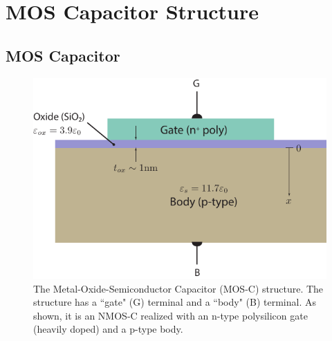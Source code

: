 \section{MOS Capacitor Structure}
\subsection{MOS Capacitor}
\begin{figure}[tbh]
\centering
\includegraphics[width=.65\columnwidth]{mos_cap_structure}
\caption{The Metal-Oxide-Semiconductor Capacitor  (MOS-C) structure.  The structure has a ``gate" (G) terminal and a ``body" (B) terminal.  As shown, it is an NMOS-C realized with an n-type polysilicon gate (heavily doped) and a p-type body.}
\label{fig:mos_cap}
\end{figure}
